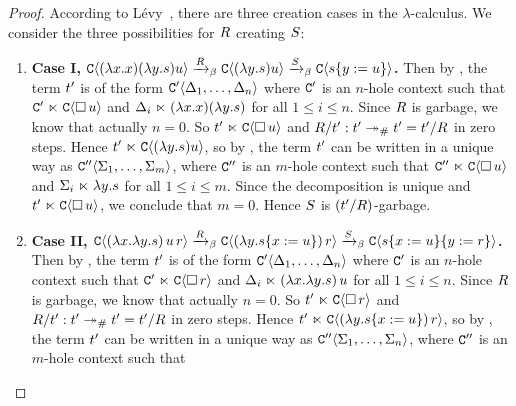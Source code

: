 \begin{proof} According to L\'evy~\cite{Tesis:Levy:1978},
there are three creation cases in the $\lambda$-calculus.
We consider the three possibilities for $R$ creating $S$:
\begin{enumerate}
\item
  {\bf Case I,
    $
       \mathtt{C}\langle(\lambda x. x)(\lambda y. s)u\rangle
     \mathrel{\xrightarrow{R}_\beta}
       \mathtt{C}\langle(\lambda y. s)u\rangle
     \mathrel{\xrightarrow{S}_\beta}
       \mathtt{C}\langle s\{y := u\}\rangle
    $.}
  Then by ,
  the term $t'$ is of the form
  $\mathtt{C}'\langle\Delta_1,\hdots,\Delta_n\rangle$
  where $\mathtt{C}'$ is an $n$-hole context such that $\mathtt{C}' \mathrel{\ltimes} \mathtt{C}\langle\Box\,u\rangle$
  and $\Delta_i \mathrel{\ltimes} (\lambda x. x)(\lambda y. s)$ for all $1 \leq i \leq n$.
  Since $R$ is garbage, we know that actually $n = 0$.
  So $t' \mathrel{\ltimes} \mathtt{C}\langle\Box\,u\rangle$ and $R/t' : t' \mathrel{\twoheadrightarrow_{\mathtt{\#}}} t' = t'/R$ in zero steps.
  Hence $t' \mathrel{\ltimes} \mathtt{C}\langle(\lambda y. s)u\rangle$,
  so by ,
  the term $t'$ can be written in a unique way as
  $\mathtt{C}''\langle\Sigma_1,\hdots,\Sigma_m\rangle$, where $\mathtt{C}''$ is an $m$-hole context
  such that $\mathtt{C}'' \mathrel{\ltimes} \mathtt{C}\langle\Box\,u\rangle$ and $\Sigma_i \mathrel{\ltimes} \lambda y. s$ for all $1 \leq i \leq m$.
  Since the decomposition is unique and $t' \mathrel{\ltimes} \mathtt{C}\langle\Box\,u\rangle$,
  we conclude that $m = 0$.
  Hence $S$ is $(t'/R)$-garbage.
\item
  {\bf Case II,
    $
       \mathtt{C}\langle(\lambda x. \lambda y. s)\,u\,r\rangle
     \mathrel{\xrightarrow{R}_\beta}
       \mathtt{C}\langle(\lambda y. s\{x := u\})\,r\rangle
     \mathrel{\xrightarrow{S}_\beta}
       \mathtt{C}\langle s\{x := u\}\{y := r\}\rangle
    $.}
  Then by ,
  the term $t'$ is of the form
  $\mathtt{C}'\langle\Delta_1,\hdots,\Delta_n\rangle$
  where $\mathtt{C}'$ is an $n$-hole context such that $\mathtt{C}' \mathrel{\ltimes} \mathtt{C}\langle\Box\,r\rangle$
  and $\Delta_i \mathrel{\ltimes} (\lambda x. \lambda y. s)\,u$ for all $1 \leq i \leq n$.
  Since $R$ is garbage, we know that actually $n = 0$.
  So $t' \mathrel{\ltimes} \mathtt{C}\langle\Box\,r\rangle$ and $R/t' : t' \mathrel{\twoheadrightarrow_{\mathtt{\#}}} t' = t'/R$
  in zero steps. Hence $t' \mathrel{\ltimes} \mathtt{C}\langle(\lambda y. s\{x := u\})\,r\rangle$,
  so by , the term $t'$ can be written in a unique way as
  $\mathtt{C}''\langle\Sigma_1,\hdots,\Sigma_n\rangle$, where $\mathtt{C}''$ is an $m$-hole context such that

\end{enumerate}
\end{proof}
